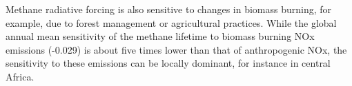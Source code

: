 Methane radiative forcing is also sensitive to changes in biomass burning, for example, due to forest management or agricultural practices. While the global annual mean sensitivity of the methane lifetime to biomass burning NOx emissions (-0.029) is about five times lower than that of anthropogenic NOx, the sensitivity to these emissions can be locally dominant, for instance in central Africa.


